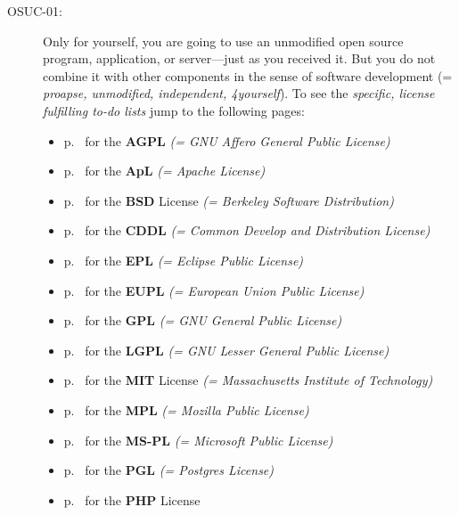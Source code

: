 \begin{description}
\label{OSUCList}
\item[OSUC-01:]\label{OSUC-01-DEF}
Only for yourself, you are going to use an unmodified open source program,
application, or server---just as you received it. But you do not combine it
with other components in the sense of software development (= \textit{proapse,
unmodified, independent, 4yourself}).
To see the \textit{specific, license fulfilling to-do lists} jump to the
following pages:
  \begin{itemize}
    \item p.\ \pageref{OSUC-01-AGPL} for the \textbf{AGPL}
      \textit{(= GNU Affero General Public License)} 
    \item p.\ \pageref{OSUC-01-Apache20} for the \textbf{ApL}
      \textit{(= Apache License)}
    \item p.\ \pageref{OSUC-01-BSD} for the \textbf{BSD} License
      \textit{(= Berkeley Software Distribution)}
    \item p.\ \pageref{OSUC-01-CDDL} for the \textbf{CDDL}
      \textit{(= Common Develop and Distribution License)}  
    \item p.\ \pageref{OSUC-01-EPL} for the \textbf{EPL}
      \textit{(= Eclipse Public License)}     
    \item p.\ \pageref{OSUC-01-EUPL} for the \textbf{EUPL}
      \textit{(= European Union Public License)} 
    \item p.\ \pageref{OSUC-01-GPL} for the \textbf{GPL}
       \textit{(= GNU General Public License)} 
    \item p.\ \pageref{OSUC-01-LGPL} for the \textbf{LGPL}
      \textit{(= GNU Lesser General Public License)}           
    \item p.\ \pageref{OSUC-01-MIT} for the \textbf{MIT} License
       \textit{(= Massachusetts Institute of Technology)} 
    \item p.\ \pageref{OSUC-01-MPL} for the \textbf{MPL}
      \textit{(= Mozilla Public License)}     
    \item p.\ \pageref{OSUC-01-MS-PL} for the \textbf{MS-PL}
      \textit{(= Microsoft Public License)} 
    \item p.\ \pageref{OSUC-01-PGL} for the \textbf{PGL}
      \textit{(= Postgres License)} 
    \item p.\ \pageref{OSUC-01-PHP} for the \textbf{PHP} License 
  \end{itemize}


\end{description}
